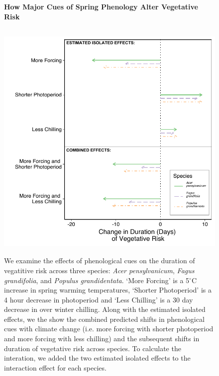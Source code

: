 \documentclass{article}\usepackage[]{graphicx}\usepackage[]{color}
\begin{document}
\begin{figure} [H] 
 \begin{center}
 \textbf{How Major Cues of Spring Phenology Alter Vegetative Risk}\par\medskip
 \includegraphics[width=12cm, height=12cm]{..//figure/Exp_plotTPS.pdf} 
 \caption{We examine the effects of phenological cues on the duration of vegatitive risk across three species: \textit{Acer pensylvanicum}, \textit{Fagus grandifolia}, and \textit{Populus grandidentata}. `More Forcing' is a 5$^{\circ}$C increase in spring warming temperatures, `Shorter Photoperiod' is a 4 hour decrease in photoperiod and `Less Chilling' is a 30 day decrease in over winter chilling. Along with the estimated isolated effects, we the show the combined predicted shifts in phenological cues with climate change (i.e. more forcing with shorter photoperiod and more forcing with less chilling) and the subsequent shifts in duration of vegetative risk across species. To calculate the interation, we added the two estimated isolated effects to the interaction effect for each species.   }\label{fig:dan} 
 \end{center}
 \end{figure}
\end{document}
